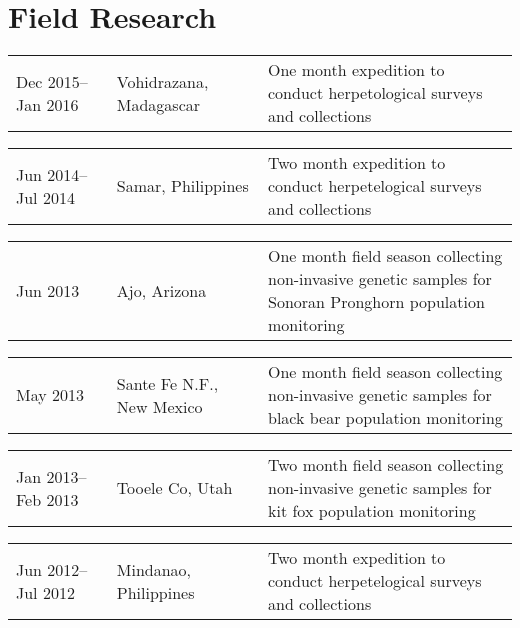 \section*{Field Research}
\begin{tabular}{ p{0.2\linewidth} p{0.3\linewidth} p{0.5\linewidth} }
    Dec 2015--Jan 2016 & Vohidrazana, Madagascar & One month expedition to conduct herpetological surveys and collections \\
\end{tabular}

\bigskip
\noindent
\begin{tabular}{ p{0.2\linewidth} p{0.3\linewidth} p{0.5\linewidth} }
    Jun 2014--Jul 2014 & Samar, Philippines & Two month expedition to conduct herpetelogical surveys and
    collections \\
\end{tabular}

\bigskip
\noindent
\begin{tabular}{ p{0.2\linewidth} p{0.3\linewidth} p{0.5\linewidth} }
    Jun 2013 & Ajo, Arizona & One month field season collecting non-invasive genetic samples for Sonoran Pronghorn population monitoring \\
\end{tabular}

\bigskip
\noindent
\begin{tabular}{ p{0.2\linewidth} p{0.3\linewidth} p{0.5\linewidth} }
    May 2013 & Sante Fe N.F., New Mexico & One month field season collecting non-invasive genetic samples for black bear population monitoring \\
\end{tabular}

\bigskip
\noindent
\begin{tabular}{ p{0.2\linewidth} p{0.3\linewidth} p{0.5\linewidth} }
    Jan 2013--Feb 2013 & Tooele Co, Utah & Two month field season collecting non-invasive genetic samples for kit fox population monitoring \\
\end{tabular}

\bigskip
\noindent
\begin{tabular}{ p{0.2\linewidth} p{0.3\linewidth} p{0.5\linewidth} }
    Jun 2012--Jul 2012 & Mindanao, Philippines & Two month expedition to conduct herpetelogical surveys and collections \\
\end{tabular}

